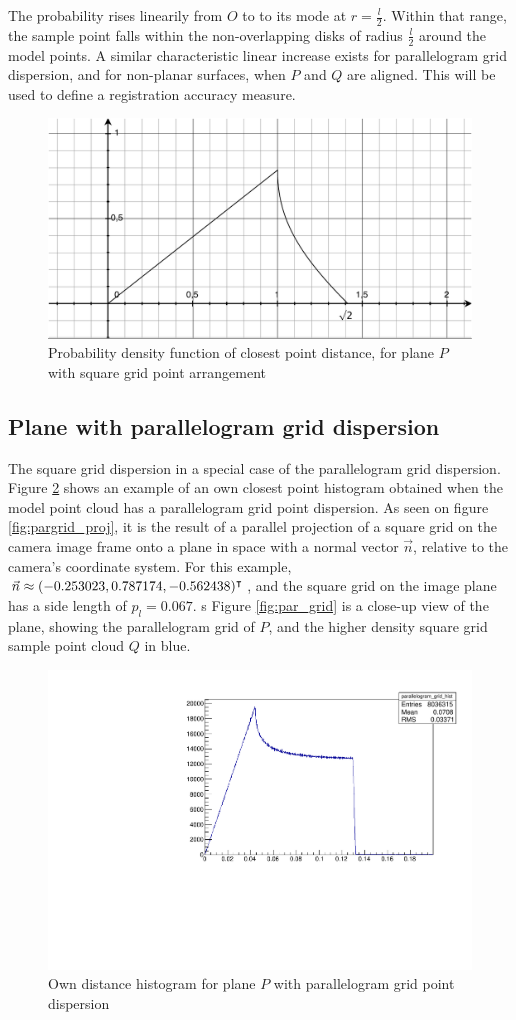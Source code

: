 The probability rises linearily from $O$ to to its mode at $r = \frac{l}{2}$. Within that range, the sample point falls within the non-overlapping disks of radius $\frac{l}{2}$ around the model points. A similar characteristic linear increase exists for parallelogram grid dispersion, and for non-planar surfaces, when $P$ and $Q$ are aligned. This will be used to define a registration accuracy measure.

\begin{figure}[p]
\centering
\includegraphics[width=.5\textwidth]{fig/sq_grid_d.pdf}
\caption{Probability density function of closest point distance, for plane $P$ with square grid point arrangement}
\label{fig:sq_grid_d}
\end{figure}


\subsection{Plane with parallelogram grid dispersion}
The square grid dispersion in a special case of the parallelogram grid dispersion. Figure \ref{fig:plane_par_cphist} shows an example of an own closest point histogram obtained when the model point cloud has a parallelogram grid point dispersion. As seen on figure \ref{fig:pargrid_proj}, it is the result of a parallel projection of a square grid on the camera image frame onto a plane in space with a normal vector $\vec{n}$, relative to the camera's coordinate system. For this example, $\vec{n} \approx (-0.253023, 0.787174, -0.562438)^\intercal$, and the square grid on the image plane has a side length of $p_l = 0.067$.
s
Figure \ref{fig:par_grid} is a close-up view of the plane, showing the parallelogram grid of $P$, and the higher density square grid sample point cloud $Q$ in blue.


\begin{figure}[H]
\centering
\includegraphics[width=.5\textwidth]{fig/parallelogram_grid.pdf}
\caption{Own distance histogram for plane $P$ with parallelogram grid point dispersion}
\label{fig:plane_par_cphist}
\end{figure}

